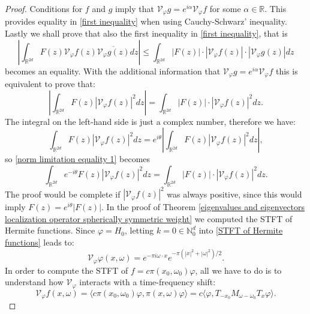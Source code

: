\documentclass[corpo=11pt, stile=classica, tipotesi=custom,
greek, evenboxes, english]{toptesi}
\numberwithin{equation}{chapter}
\theoremstyle{definition}
\theoremstyle{remark}
\newcommand{\R}{\mathbb{R}} %
\newcommand{\N}{\mathbb{N}} %
\newcommand{\V}{\mathcal{V}} %
\begin{document}
\begin{proof}
	Conditions for $f$ and $g$ imply that $\V_{\varphi} g  = e^{i \alpha} \V_{\varphi} f$ for some $\alpha \in \R$. This provides equality in \eqref{first inequality} when using Cauchy-Schwarz' inequality. Lastly we shall prove that also the first inequality in \eqref{first inequality}, that is
	\begin{equation*}
		\left\vert \int_{\R^{2d}} F(z) \V_{\varphi} f(z) \overline{\V_{\varphi} g(z)} dz \right\vert \leq \int_{\R^{2d}} |F(z)| \cdot | \V_{\varphi} f(z)| \cdot |\V_{\varphi} g(z)| dz
	\end{equation*}
	becomes an equality. With the additional information that $\V_{\varphi} g  = e^{i \alpha} \V_{\varphi} f$ this is equivalent to prove that:
	\begin{equation}\label{norm limitation equality 1}
		\left\vert \int_{\R^{2d}} F(z) |\V_{\varphi} f(z)|^2 dz \right\vert = \int_{\R^{2d}} |F(z)| \cdot | \V_{\varphi} f(z)|^2 dz.
	\end{equation}
	The integral on the left-hand side is just a complex number, therefore we have:
	\begin{equation*}
		\int_{\R^{2d}} F(z) |\V_{\varphi} f(z)|^2 dz = e^{i \theta} \left\vert \int_{\R^{2d}} F(z) |\V_{\varphi} f(z)|^2 dz \right\vert,
	\end{equation*}
	so \eqref{norm limitation equality 1} becomes
	\begin{equation*}
		\int_{\R^{2d}} e^{-i \theta} F(z) |\V_{\varphi} f(z)|^2 dz = \int_{\R^{2d}} |F(z)| \cdot | \V_{\varphi} f(z)|^2 dz.
	\end{equation*}
	The proof would be complete if $|\V_{\varphi} f(z)|^2$ was always positive, since this would imply $F(z) = e^{i \theta} |F(z)|$.
	In the proof of Theorem \ref{eigenvalues and eigenvectors localization operator spherically symmetric weight} we computed the STFT of Hermite functions. Since $\varphi = H_0$, letting $k = 0 \in \N_0^d$ into \eqref{STFT of Hermite functions} leads to:
	\begin{equation*}
		\V_{\varphi} \varphi (x, \omega) = e^{- \pi i \omega \cdot x} e^{- \pi (|x|^2 + |\omega|^2)/2}. 
	\end{equation*}
	In order to compute the STFT of $f = c \pi(x_0, \omega_0) \varphi$, all we have to do is to understand how $\V_{\varphi}$ interacts with a time-frequency shift:
	\begin{equation*}
		\V_{\varphi} f (x, \omega) = \langle c \pi(x_0, \omega_0) \varphi, \pi(x, \omega) \varphi \rangle = c \langle \varphi, T_{-x_0} M_{\omega - \omega_0} T_{x} \varphi \rangle.

\end{equation*}
\end{proof}
\end{document}
